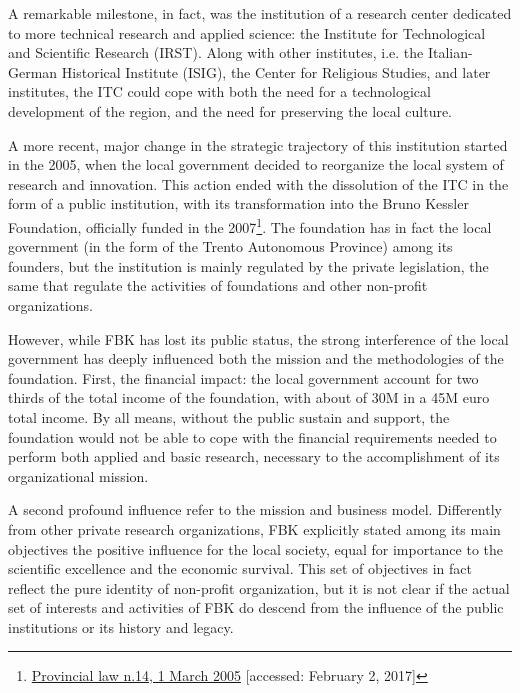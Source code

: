 A remarkable milestone, in fact, was the institution of a research center dedicated to more technical research and applied science: the Institute for Technological and Scientific Research (IRST). Along with other institutes, i.e. the Italian-German Historical Institute (ISIG), the Center for Religious Studies, and later institutes, the ITC could cope with both the need for a technological development of the region, and the need for preserving the local culture. 

A more recent, major change in the strategic trajectory of this institution started in the 2005, when the local government decided to reorganize the local system of research and innovation. This action ended with the dissolution of the ITC in the form of a public institution, with its transformation into the Bruno Kessler Foundation, officially funded in the 2007\footnote{
	\href{http://www.consiglio.provincia.tn.it/leggi-e-archivi/codice-provinciale/archivio/Pages/Legge\%20provinciale\%202\%20agosto\%202005,\%20n.\%2014_12567.aspx?zid=6003d625-228e-4e5d-820d-d6cf459dfc36}
	{Provincial law n.14, 1 March 2005}
	[accessed: February 2, 2017]
}. The foundation has in fact the local government (in the form of the Trento Autonomous Province) among its founders, but the institution is mainly regulated by the private legislation, the same that regulate the activities of foundations and other non-profit organizations. 

However, while FBK has lost its public status, the strong interference of the local government has deeply influenced both the mission and the methodologies of the foundation. First, the financial impact: the local government account for two thirds of the total income of the foundation, with about of 30M in a 45M euro total income. By all means, without the public sustain and support, the foundation would not be able to cope with the financial requirements needed to perform both applied and basic research, necessary to the accomplishment of its organizational mission.

A second profound influence refer to the mission and business model. Differently from other private research organizations, FBK explicitly stated among its main objectives the positive influence for the local society, equal for importance to the scientific excellence and the economic survival. This set of objectives in fact reflect the pure identity of non-profit organization, but it is not clear if the actual set of interests and activities of FBK do descend from the influence of the public institutions or its history and legacy.

